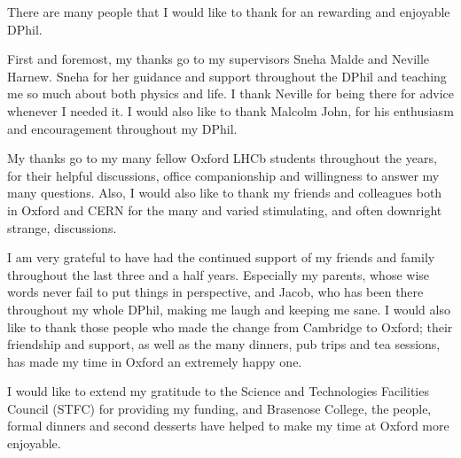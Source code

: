
There are many people that I would like to thank for an rewarding and enjoyable DPhil.

First and foremost, my thanks go to my supervisors Sneha Malde and Neville Harnew. Sneha for her guidance and support throughout the DPhil and teaching me so much about both physics and life. I thank Neville for being there for advice whenever I needed it. I would also like to thank Malcolm John, for his enthusiasm and encouragement throughout my DPhil.

My thanks go to my many fellow Oxford LHCb students throughout the years, for their helpful discussions, office companionship and willingness to answer my many questions. Also, I would also like to thank my friends and colleagues both in Oxford and CERN for the many and varied stimulating, and often downright strange, discussions.

I am very grateful to have had the continued support of my friends and family throughout the last three and a half years. Especially my parents, whose wise words never fail to put things in perspective, and Jacob, who has been there throughout my whole DPhil, making me laugh and keeping me sane. I would also like to thank those people who made the change from Cambridge to Oxford; their friendship and support, as well as the many dinners, pub trips and tea sessions, has made my time in Oxford an extremely happy one.

I would like to extend my gratitude to the Science and Technologies Facilities Council (STFC) for providing my funding, and Brasenose College, the people, formal dinners and second desserts have helped to make my time at Oxford more enjoyable.